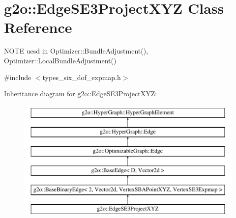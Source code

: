 \hypertarget{classg2o_1_1_edge_s_e3_project_x_y_z}{}\section{g2o\+:\+:Edge\+S\+E3\+Project\+X\+YZ Class Reference}
\label{classg2o_1_1_edge_s_e3_project_x_y_z}


N\+O\+TE uesd in Optimizer\+::\+Bundle\+Adjustment(), Optimizer\+::\+Local\+Bundle\+Adjustment()  




{\ttfamily \#include $<$types\+\_\+six\+\_\+dof\+\_\+expmap.\+h$>$}

Inheritance diagram for g2o\+:\+:Edge\+S\+E3\+Project\+X\+YZ\+:\begin{figure}[H]
\begin{center}
\leavevmode
\includegraphics[height=6.000000cm]{classg2o_1_1_edge_s_e3_project_x_y_z}
\end{center}
\end{figure}
